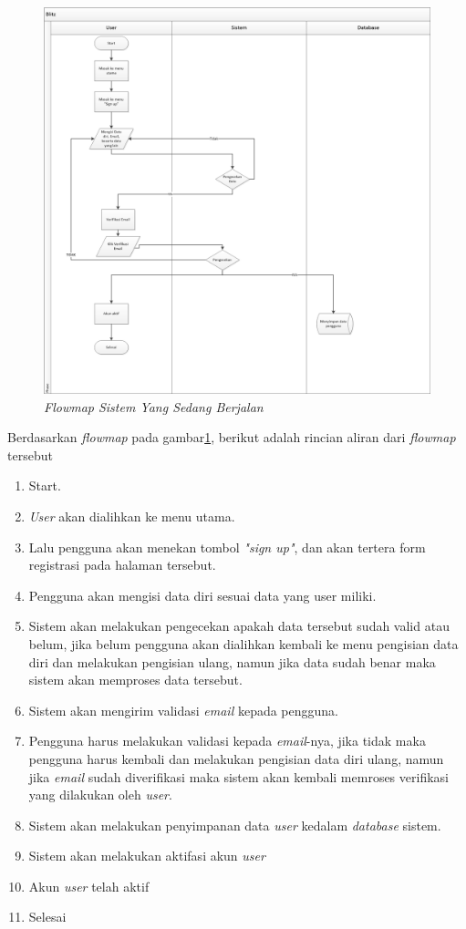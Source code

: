 \begin{figure}[!htbp]
    \centering
    \includegraphics[scale=0.4]{gambar/flow1}
    \caption{\textit{Flowmap Sistem Yang Sedang Berjalan}}
    \label{flowmapsistem}
\end{figure}

\par
Berdasarkan \textit{flowmap} pada gambar\ref{flowmapsistem}, berikut adalah rincian aliran dari \textit{flowmap} tersebut
\begin{enumerate}
\item Start.
\item \textit{User} akan dialihkan ke menu utama.
\item Lalu pengguna akan menekan tombol \textit{"sign up"}, dan akan tertera form registrasi pada halaman tersebut.
\item Pengguna akan mengisi data diri sesuai data yang user miliki.
\item Sistem akan melakukan pengecekan apakah data tersebut sudah valid atau belum, jika belum pengguna akan dialihkan kembali ke menu pengisian data diri dan melakukan pengisian ulang, namun jika data sudah benar maka sistem akan memproses data tersebut.
\item Sistem akan mengirim validasi \textit{email} kepada pengguna.
\item Pengguna harus melakukan validasi kepada \textit{email}-nya, jika tidak maka pengguna harus kembali dan melakukan pengisian data diri ulang, namun jika \textit{email} sudah diverifikasi maka sistem akan kembali memroses verifikasi yang dilakukan oleh \textit{user}.
\item Sistem akan melakukan penyimpanan data \textit{user} kedalam \textit{database} sistem.
\item Sistem akan melakukan aktifasi akun \textit{user}
\item Akun \textit{user} telah aktif
\item Selesai
\end{enumerate}


